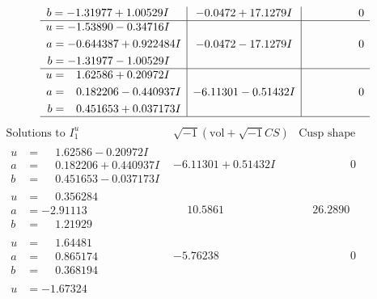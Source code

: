 \documentclass[1p]{elsarticle_modified}
\theoremstyle{definition}
\newcommand{\I}{\sqrt{-1}}
\begin{document}
$$\begin{array}{c|c|c}
\begin{aligned}
b &= -1.31977 + 1.00529 I\end{aligned}
 & -0.0472 + 17.1279 I & \phantom{-0.000000 } 0 \\ \hline\begin{aligned}
u &= -1.53890 - 0.34716 I \\
a &= -0.644387 + 0.922484 I \\
b &= -1.31977 - 1.00529 I\end{aligned}
 & -0.0472 - 17.1279 I & \phantom{-0.000000 } 0 \\ \hline\begin{aligned}
u &= \phantom{-}1.62586 + 0.20972 I \\
a &= \phantom{-}0.182206 - 0.440937 I \\
b &= \phantom{-}0.451653 + 0.037173 I\end{aligned}
 & -6.11301 - 0.51432 I & \phantom{-0.000000 } 0\\
 \hline 
 \end{array}$$\newpage$$\begin{array}{c|c|c}  
\text{Solutions to }I^u_{1}& \I (\text{vol} + \sqrt{-1}CS) & \text{Cusp shape}\\
 \hline 
\begin{aligned}
u &= \phantom{-}1.62586 - 0.20972 I \\
a &= \phantom{-}0.182206 + 0.440937 I \\
b &= \phantom{-}0.451653 - 0.037173 I\end{aligned}
 & -6.11301 + 0.51432 I & \phantom{-0.000000 } 0 \\ \hline\begin{aligned}
u &= \phantom{-}0.356284\phantom{ +0.000000I} \\
a &= -2.91113\phantom{ +0.000000I} \\
b &= \phantom{-}1.21929\phantom{ +0.000000I}\end{aligned}
 & \phantom{-}10.5861\phantom{ +0.000000I} & \phantom{-}26.2890\phantom{ +0.000000I} \\ \hline\begin{aligned}
u &= \phantom{-}1.64481\phantom{ +0.000000I} \\
a &= \phantom{-}0.865174\phantom{ +0.000000I} \\
b &= \phantom{-}0.368194\phantom{ +0.000000I}\end{aligned}
 & -5.76238\phantom{ +0.000000I} & \phantom{-0.000000 } 0 \\ \hline\begin{aligned}
u &= -1.67324\phantom{ +0.000000I} \\

\end{aligned}
\end{array}$$
\end{document}
